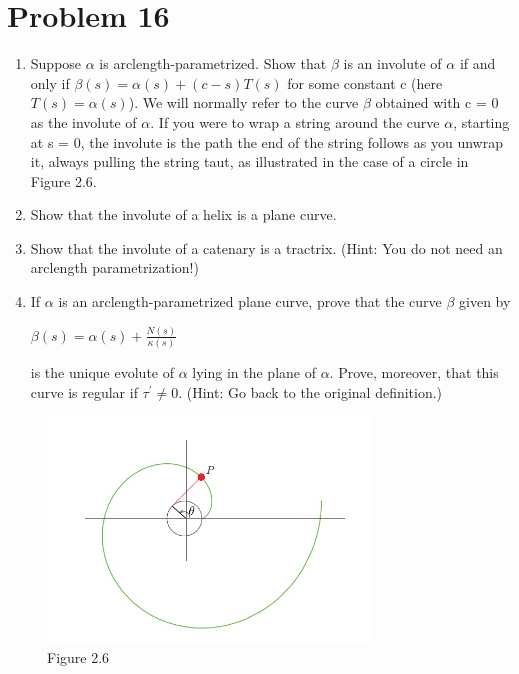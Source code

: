 \documentclass[
	12pt, %
]{fphw}
\theoremstyle{plain}
\begin{document}
\section*{Problem 16}
\begin{problem}
     \begin{enumerate} %
          \item  Suppose $\alpha$ is arclength-parametrized. Show that $\beta$ is an involute of $\alpha$ if and only if $\beta(s) =
          \alpha(s)+(c-s)T(s)$ for some constant c (here $T(s) = \alpha(s)$). We will normally refer to the curve $\beta$
          obtained with c = 0 as the involute of $\alpha$. If you were to wrap a string around the curve $\alpha$, starting
          at s = 0, the involute is the path the end of the string follows as you unwrap it, always pulling the
          string taut, as illustrated in the case of a circle in Figure 2.6.
          \item  Show that the involute of a helix is a plane curve.
          \item Show that the involute of a catenary is a tractrix. (Hint: You do not need an arclength parametrization!)
          \item If $\alpha$ is an arclength-parametrized plane curve, prove that the curve $\beta$ given by
          \begin{center}
               $\beta(s) =  \alpha(s) + \frac{N(s)}{\kappa(s)}$
          \end{center}
          is the unique evolute of $\alpha$ lying in the plane of $\alpha$. Prove, moreover, that this curve is regular if
          $\tau^{'} \neq 0$. (Hint: Go back to the original definition.)
     \end{enumerate}
\end{problem}
\begin{figure}[!ht]
     \centering
     \includegraphics[width=\linewidth, width=14cm, height=6cm]{question_16.jpg}
     \caption{Figure 2.6}
\end{figure}
\end{document}
